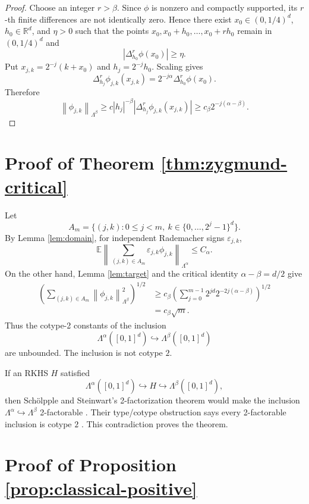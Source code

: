 \documentclass[11pt]{article}
\newcommand{\R}{\mathbb{R}}
\newcommand{\eps}{\varepsilon}
\newcommand{\Lam}{\Lambda}
\newcommand{\norm}[1]{\left\lVert #1\right\rVert}
\newcommand{\abs}[1]{\left\lvert #1\right\rvert}
\begin{document}
\begin{proof}
Choose an integer \(r>\beta\). Since \(\phi\) is nonzero and compactly
supported, its \(r\)-th finite differences are not identically zero. Hence
there exist \(x_0\in(0,1/4)^d\), \(h_0\in\R^d\), and \(\eta>0\) such that
the points \(x_0,x_0+h_0,\ldots,x_0+rh_0\) remain in \((0,1/4)^d\) and
\[
  \abs{\Delta_{h_0}^r\phi(x_0)}\ge\eta .
\]
Put \(x_{j,k}=2^{-j}(k+x_0)\) and \(h_j=2^{-j}h_0\). Scaling gives
\[
  \Delta_{h_j}^r\phi_{j,k}(x_{j,k})
  =
  2^{-j\alpha}\Delta_{h_0}^r\phi(x_0).
\]
Therefore
\[
  \norm{\phi_{j,k}}_{\Lam^\beta}
  \ge
  c\abs{h_j}^{-\beta}
  \abs{\Delta_{h_j}^r\phi_{j,k}(x_{j,k})}
  \ge
  c_\beta2^{-j(\alpha-\beta)} .
\]
\end{proof}

\section*{Proof of Theorem \ref{thm:zygmund-critical}}

Let
\[
  A_m=\{(j,k):0\le j<m,\ k\in\{0,\ldots,2^j-1\}^d\}.
\]
By Lemma \ref{lem:domain}, for independent Rademacher signs
\(\eps_{j,k}\),
\[
  \mathbb{E}
  \left\|
    \sum_{(j,k)\in A_m}\eps_{j,k}\phi_{j,k}
  \right\|_{\Lam^\alpha}
  \le C_\alpha .
\]
On the other hand, Lemma \ref{lem:target} and the critical identity
\(\alpha-\beta=d/2\) give
\[
\begin{aligned}
  \left(
    \sum_{(j,k)\in A_m}
    \norm{\phi_{j,k}}_{\Lam^\beta}^2
  \right)^{1/2}
  &\ge
  c_\beta
  \left(
    \sum_{j=0}^{m-1}2^{jd}2^{-2j(\alpha-\beta)}
  \right)^{1/2} \\
  &=c_\beta\sqrt m .
\end{aligned}
\]
Thus the cotype-2 constants of the inclusion
\[
  \Lam^\alpha([0,1]^d)\hookrightarrow\Lam^\beta([0,1]^d)
\]
are unbounded. The inclusion is not cotype \(2\).

If an RKHS \(H\) satisfied
\[
  \Lam^\alpha([0,1]^d)\hookrightarrow H
  \hookrightarrow\Lam^\beta([0,1]^d),
\]
then Sch\"olpple and Steinwart's 2-factorization theorem would make the
inclusion \(\Lam^\alpha\hookrightarrow\Lam^\beta\) 2-factorable
\cite[Theorem 6]{SS}. Their type/cotype obstruction says every
2-factorable inclusion is cotype \(2\) \cite[Lemma 5 and Corollary 8]{SS}.
This contradiction proves the theorem.

\section*{Proof of Proposition \ref{prop:classical-positive}}
\end{document}
